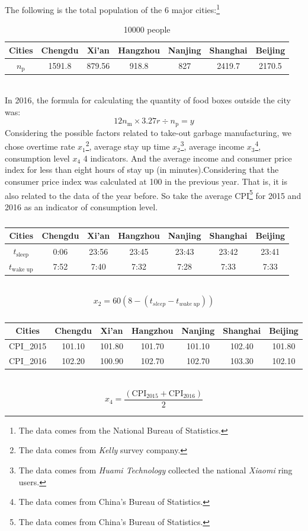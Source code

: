 \documentclass[UTF8]{article}
\begin{document}
The following is the total population of the 6 major cities:\footnote{The data comes from the National Bureau of Statistics.}\\
\begin{table}[h]
\caption{10000 people
}
\begin{center}
\begin{tabular}{ccccccc}
\hline
Cities&Chengdu&Xi’an&Hangzhou&Nanjing&Shanghai&Beijing\\
\hline
\(n_{\textrm{p}}\)&1591.8&879.56&918.8&827&2419.7&2170.5\\
\hline
\end{tabular}
\end{center}
\end{table}\\
\indent In 2016, the formula for calculating the quantity of food boxes outside the city was:
\[12n_{\textrm{m}}\times3.27r\div n_{\textrm{p}}=y\]
\indent Considering the possible factors related to take-out garbage manufacturing, we chose overtime rate \(x_1\)\footnote{The data comes from  \textit{Kelly} survey company.}, average stay up time \(x_2\)\footnote{The data comes from \textit{Huami Technology} collected the national \textit{Xiaomi} ring users.}, average income \(x_3\)\footnote{The data comes from China's Bureau of Statistics.}, consumption level \(x_4\) 4 indicators. And the average income and consumer price index for less than eight hours of stay up (in minutes).Considering that the consumer price index was calculated at 100 in the previous year. That is, it is also related to the data of the year before. So take the average CPI\footnote{The data comes from China's Bureau of Statistics.} for 2015 and 2016 as an indicator of consumption level.
\begin{table}[h]
\centering
\caption{}
\begin{tabular}{ccccccc}
\hline
Cities& Chengdu & Xi'an & Hangzhou & Nanjing & Shanghai & Beijing \\
\hline
\(t_{\textrm{sleep}}\)& 0:06    & 23:56 & 23:45    & 23:43   & 23:42    & 23:41\\
\hline
\(t_{\textrm{wake\ up}}\) & 7:52    & 7:40  & 7:32     & 7:28    & 7:33     & 7:33 \\
\hline
\end{tabular}
\end{table}\\
\[x_2=60(8-(t_{sleep}-t_{wake\ up}))\]
\begin{table}[h]
\centering
\caption{}
\begin{tabular}{ccccccc}
\hline
Cities        & Chengdu & Xi'an  & Hangzhou & Nanjing & Shanghai & Beijing \\
\hline
CPI_{2015} & 101.10  & 101.80 & 101.70   & 101.10  & 102.40   & 101.80  \\
\hline
CPI_{2016} & 102.20  & 100.90 & 102.70   & 102.70  & 103.30   & 102.10\\
\hline
\end{tabular}
\end{table}\\
\[x_4=\frac{(\textrm{CPI}_{2015}+\textrm{CPI}_{2016})}{2}\]
\end{document}
